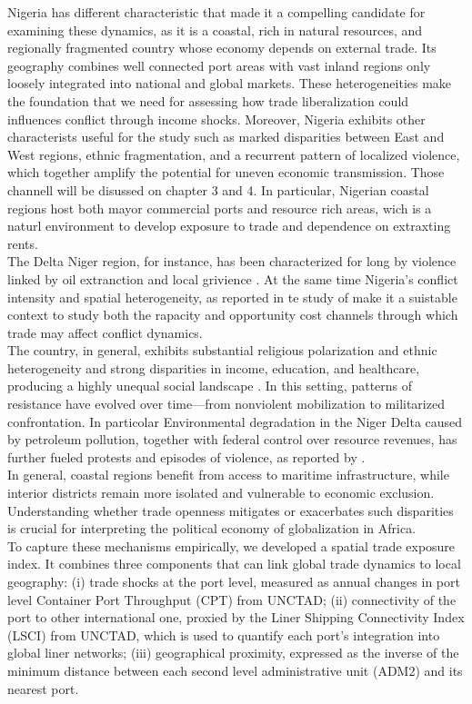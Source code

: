 Nigeria has different characteristic that made it a compelling candidate for examining these dynamics, as it is a coastal, rich in natural resources, and regionally fragmented country whose economy depends on external trade. Its geography combines well connected port areas with vast inland regions only loosely integrated into national and global markets. These heterogeneities make the foundation that we need for assessing how trade liberalization could influences conflict through income shocks. 
Moreover, Nigeria exhibits other characterists useful for the study such as marked disparities between East and West regions, ethnic fragmentation, and a recurrent pattern of localized violence, which together amplify the potential for uneven economic transmission. Those channell will be disussed on chapter 3 and 4. 
In particular, Nigerian coastal regions host both mayor commercial ports and resource rich areas, wich is a naturl environment to develop exposure to trade and dependence on extraxting rents. \\
The Delta Niger region, for instance, has been characterized for long by violence linked by oil extranction and local grivience \parencite{obi2010oil}. At the same time Nigeria's conflict intensity and spatial heterogeneity, as reported in te study of \textcite{bertoni2019education} make it a suistable context to study both the rapacity and opportunity cost channels through which trade may affect conflict dynamics. \\
The country, in general, exhibits substantial religious polarization and ethnic heterogeneity and strong disparities in income, education, and healthcare, producing a highly unequal social landscape \parencite{montalvo2005ethnic}. 
In this setting, patterns of resistance have evolved over time—from nonviolent mobilization to militarized confrontation. In particolar Environmental degradation in the Niger Delta caused by petroleum pollution, together with federal control over resource revenues, has further fueled protests and episodes of violence, as reported by \textcite{campbell2010revisiting}. \\
In general, coastal regions benefit from access to maritime infrastructure, while interior districts remain more isolated and vulnerable to economic exclusion. Understanding whether trade openness mitigates or exacerbates such disparities is crucial for interpreting the political economy of globalization in Africa.\\

To capture these mechanisms empirically, we developed a spatial trade exposure index. It combines three components that can link global trade dynamics to local geography: (i) trade shocks at the port level, measured as annual changes in port level Container Port Throughput (CPT) from UNCTAD; (ii) connectivity of the port to other international one, proxied by the Liner Shipping Connectivity Index (LSCI) from UNCTAD, which is used to quantify each port’s integration into global liner networks; (iii) geographical proximity, expressed as the inverse of the minimum distance between each second level administrative unit (ADM2) and its nearest port. \\

